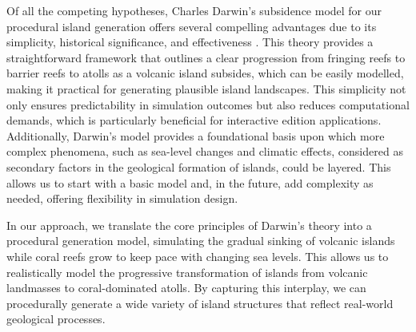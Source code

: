 

Of all the competing hypotheses, Charles Darwin's subsidence model for our procedural island generation offers several compelling advantages due to its simplicity, historical significance, and effectiveness \cite{Tomascik1997}. This theory provides a straightforward framework that outlines a clear progression from fringing reefs to barrier reefs to atolls as a volcanic island subsides, which can be easily modelled, making it practical for generating plausible island landscapes. This simplicity not only ensures predictability in simulation outcomes but also reduces computational demands, which is particularly beneficial for interactive edition applications. Additionally, Darwin's model provides a foundational basis upon which more complex phenomena, such as sea-level changes and climatic effects, considered as secondary factors in the geological formation of islands, could be layered. This allows us to start with a basic model and, in the future, add complexity as needed, offering flexibility in simulation design.

In our approach, we translate the core principles of Darwin's theory into a procedural generation model, simulating the gradual sinking of volcanic islands while coral reefs grow to keep pace with changing sea levels. This allows us to realistically model the progressive transformation of islands from volcanic landmasses to coral-dominated atolls. By capturing this interplay, we can procedurally generate a wide variety of island structures that reflect real-world geological processes.

